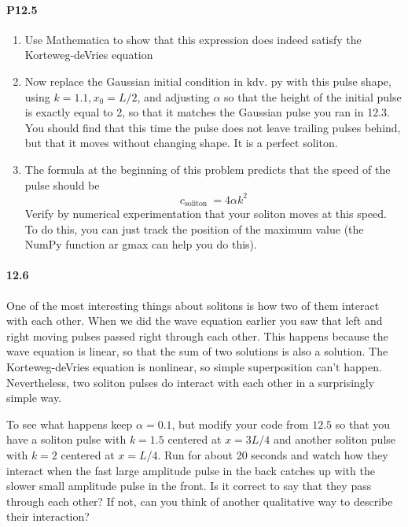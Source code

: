 \paragraph*{P12.5}
\begin{enumerate}[label=(\alph*)]
\item Use Mathematica to show that this expression does indeed satisfy the
Korteweg-deVries equation
\item Now replace the Gaussian initial condition in $\mathrm{kdv}$. py with this pulse shape, using $k=1.1, x_{0}=L / 2$, and adjusting $\alpha$ so that the height of the initial pulse is exactly equal to 2, so that it matches the Gaussian pulse you ran in 12.3. You should find that this time the pulse does not leave trailing pulses behind, but that it moves without changing shape. It is a perfect soliton.
\item The formula at the beginning of this problem predicts that the speed of the pulse should be 
\begin{equation}\label{eq:1215}
c_{\text {soliton }}=4 \alpha k^{2}
\end{equation}
Verify by numerical experimentation that your soliton moves at this speed. To do this, you can just track the position of the maximum value (the NumPy function ar gmax can help you do this).
\end{enumerate}
\paragraph*{12.6}
One of the most interesting things about solitons is how two of them interact with each other. When we did the wave equation earlier you saw that left and right moving pulses passed right through each other. This happens because the wave equation is linear, so that the sum of two solutions is also a solution. The Korteweg-deVries equation is nonlinear, so simple superposition can't happen. Nevertheless, two soliton pulses do interact with each other in a surprisingly simple way.

To see what happens keep $\alpha=0.1$, but modify your code from $12.5$ so that you have a soliton pulse with $k=1.5$ centered at $x=3 L / 4$ and another soliton pulse with $k=2$ centered at $x=L / 4$. Run for about 20 seconds and watch how they interact when the fast large amplitude pulse in the back catches up with the slower small amplitude pulse in the front. Is it correct to say that they pass through each other? If not, can you think of another qualitative way to describe their interaction?

